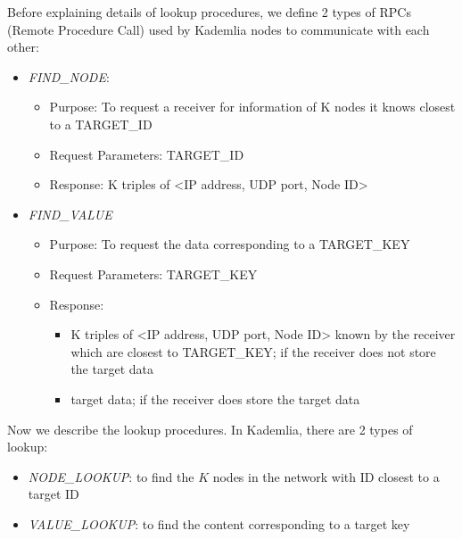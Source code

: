 Before explaining details of lookup procedures, we define 2 types of RPCs (Remote Procedure Call) used by Kademlia nodes to communicate with each other:
\begin{itemize}
  \item \textit{FIND\_NODE}:
  \begin{itemize}
    \item Purpose: To request a receiver for information of K nodes it knows closest to a TARGET\_ID
    \item Request Parameters: TARGET\_ID
    \item Response: K triples of <IP address, UDP port, Node ID>
  \end{itemize}
  \item \textit{FIND\_VALUE}
  \begin{itemize}
    \item Purpose: To request the data corresponding to a TARGET\_KEY
    \item Request Parameters: TARGET\_KEY
    \item Response: 
    \begin{itemize}
      \item K triples of <IP address, UDP port, Node ID> known by the receiver which are closest to TARGET\_KEY; if the receiver does not store the target data
      \item target data; if the receiver does store the target data
    \end{itemize}
  \end{itemize}
\end{itemize}

\noindent Now we describe the lookup procedures. In Kademlia, there are 2 types of lookup:
\begin{itemize}
  \item \textit{NODE\_LOOKUP}: to find the $K$ nodes in the network with ID closest to a target ID
  \item \textit{VALUE\_LOOKUP}: to find the content corresponding to a target key
\end{itemize}

\newpage

